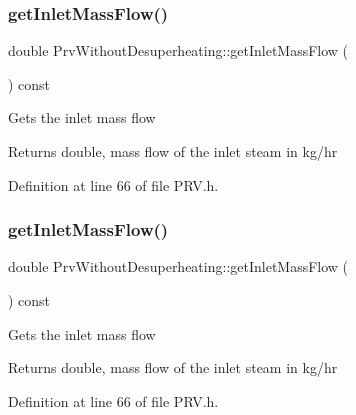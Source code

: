 \subsubsection{\texorpdfstring{get\+Inlet\+Mass\+Flow()}{getInletMassFlow()}\hspace{0.1cm}{\footnotesize\ttfamily [2/3]}}
{\footnotesize\ttfamily double Prv\+Without\+Desuperheating\+::get\+Inlet\+Mass\+Flow (\begin{DoxyParamCaption}{ }\end{DoxyParamCaption}) const\hspace{0.3cm}{\ttfamily [inline]}}

Gets the inlet mass flow

\begin{DoxyReturn}{Returns}
double, mass flow of the inlet steam in kg/hr 
\end{DoxyReturn}


Definition at line 66 of file P\+R\+V.\+h.

\mbox{\label{class_prv_without_desuperheating_a0ae2ed88cc8bd4e69cddc05ef1225811}} 
\subsubsection{\texorpdfstring{get\+Inlet\+Mass\+Flow()}{getInletMassFlow()}\hspace{0.1cm}{\footnotesize\ttfamily [3/3]}}
{\footnotesize\ttfamily double Prv\+Without\+Desuperheating\+::get\+Inlet\+Mass\+Flow (\begin{DoxyParamCaption}{ }\end{DoxyParamCaption}) const\hspace{0.3cm}{\ttfamily [inline]}}

Gets the inlet mass flow

\begin{DoxyReturn}{Returns}
double, mass flow of the inlet steam in kg/hr 
\end{DoxyReturn}


Definition at line 66 of file P\+R\+V.\+h.

\mbox{\label{class_prv_without_desuperheating_a4b1244b479abfaef01abbb62395dff13}} 
